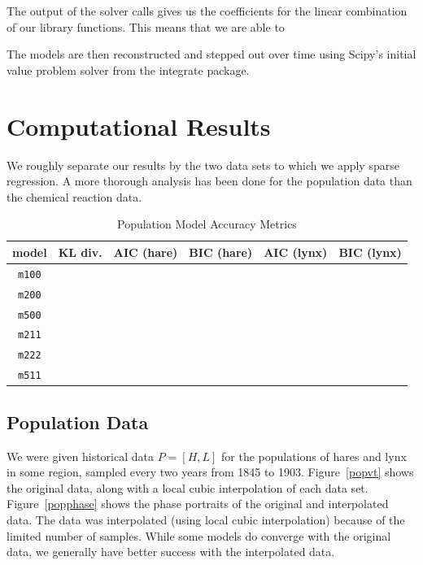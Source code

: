 \documentclass[10pt]{article}
\begin{document}
The output of the solver calls gives us the coefficients for the linear combination of our library functions. This means that we are able to

The models are then reconstructed and stepped out over time using Scipy's initial value problem solver from the integrate package.

\section{Computational Results}
We roughly separate our results by the two data sets to which we apply sparse regression. A more thorough analysis has been done for the population data than the chemical reaction data.

\begin{table}[!b]\centering
\begin{tabular}{|c|c|c|c|c|c|} \hline
model & KL div. & AIC (hare) & BIC (hare) & AIC (lynx) & BIC (lynx)\\ \hline \hline
{\tt m100} &  &  &  \\ \hline
{\tt m200} &  &  &  \\ \hline
{\tt m500} &  &  &  \\ \hline
{\tt m211} &  &  &  \\ \hline
{\tt m222} &  &  &  \\ \hline
{\tt m511} &  &  &  \\ \hline
\end{tabular}
\caption{Population Model Accuracy Metrics}
\label{models_table}
\end{table}

\subsection{Population Data}
We were given historical data \( P = [H,L] \) for the populations of hares and lynx in some region, sampled every two years from 1845 to 1903. Figure~\ref{popvt} shows the original data, along with a local cubic interpolation of each data set. Figure~\ref{popphase} shows the phase portraits of the original and interpolated data. The data was interpolated (using local cubic interpolation) because of the limited number of samples. While some models do converge with the original data, we generally have better success with the interpolated data.
\end{document}
